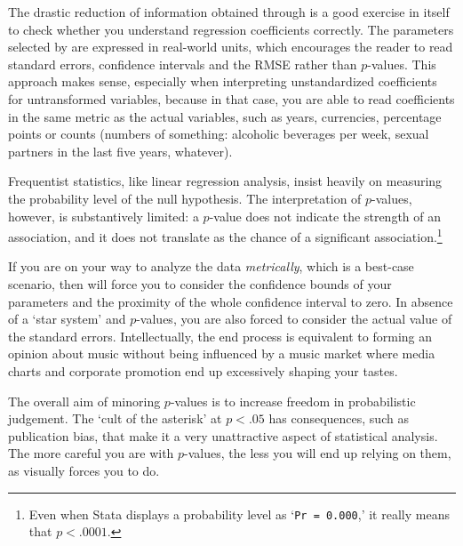 	The drastic reduction of information obtained through  is a good exercise in itself to check whether you understand regression coefficients correctly. The parameters selected by  are expressed in real-world units, which encourages the reader to read standard errors, confidence intervals and the RMSE rather than $p$-values. This approach makes sense, especially when interpreting unstandardized coefficients for untransformed variables, because in that case, you are able to read coefficients in the same metric as the actual variables, such as years, currencies, percentage points or counts (\ie numbers of something: alcoholic beverages per week, sexual partners in the last five years, whatever).

	Frequentist statistics, like linear regression analysis, insist heavily on measuring the probability level of the null hypothesis. The interpretation of $p$-values, however, is substantively limited: a $p$-value does not indicate the strength of an association, and it does not translate as the chance of a significant association.\footnote{Even when Stata displays a probability level as `\texttt{Pr = 0.000},' it really means that $p < .0001$.}
	
	If you are on your way to analyze the data \emph{metrically}, which is a best-case scenario, then  will force you to consider the confidence bounds of your parameters and the proximity of the whole confidence interval to zero. In absence of a `star system' and $p$-values, you are also forced to consider the actual value of the standard errors. Intellectually, the end process is equivalent to forming an opinion about music without being influenced by a music market where media charts and corporate promotion end up excessively shaping your tastes.
	
	The overall aim of minoring $p$-values is to increase freedom in probabilistic judgement. The `cult of the asterisk' at $p < .05$ has consequences, such as publication bias, that make it a very unattractive aspect of statistical analysis. The more careful you are with $p$-values, the less you will end up relying on them, as  visually forces you to do.